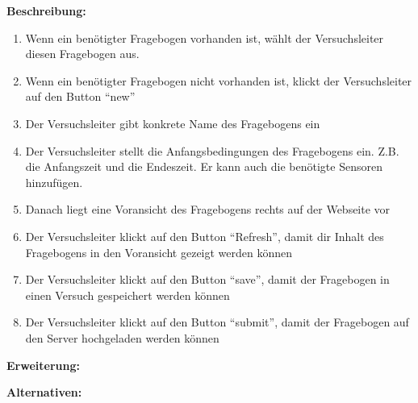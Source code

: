 \documentclass[a4paper]{scrreprt}
\begin{document}
\begin{itemize}
                \par \textbf{Beschreibung: }
                \begin{enumerate}
                    \item Wenn ein benötigter Fragebogen vorhanden ist, wählt der \gls{Versuchsleiter} diesen Fragebogen aus.
                    \item Wenn ein benötigter Fragebogen nicht vorhanden ist, klickt der \gls{Versuchsleiter} auf den Button ``new''
                    \item Der \gls{Versuchsleiter} gibt konkrete Name des Fragebogens ein
                    \item Der \gls{Versuchsleiter} stellt die Anfangsbedingungen des Fragebogens ein. Z.B. die Anfangszeit und die Endeszeit. Er kann auch die benötigte Sensoren hinzufügen.
                    \item Danach liegt eine Voransicht des Fragebogens rechts auf der Webseite vor
                    \item  Der \gls{Versuchsleiter} klickt auf den Button ``Refresh'', damit dir Inhalt des Fragebogens in den Voransicht gezeigt werden können
                    \item Der \gls{Versuchsleiter} klickt auf den Button ``save'', damit der Fragebogen in einen Versuch gespeichert werden können
                    \item Der \gls{Versuchsleiter} klickt auf den Button ``submit'', damit der Fragebogen auf den Server hochgeladen werden können
                \end{enumerate}
                \par \textbf{Erweiterung: }
                \par \textbf{Alternativen: }



\end{itemize}
\end{document}
